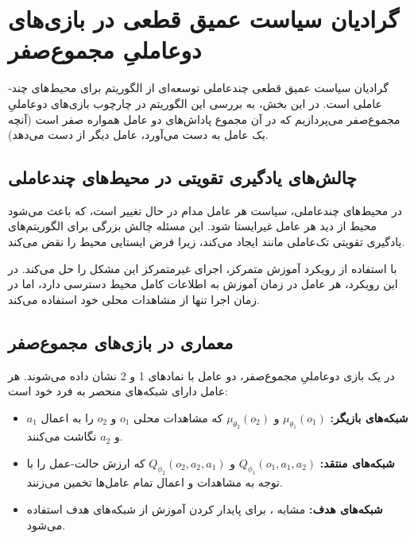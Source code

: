 \section{ گرادیان سیاست عمیق قطعی 
در بازی‌های دو­عاملیِ مجموع‌­صفر
}

گرادیان سیاست عمیق قطعی چند­عاملی
توسعه‌ای از الگوریتم  برای محیط‌های چند­عاملی است. در این بخش، به بررسی این الگوریتم در چارچوب بازی‌های دو­عاملیِ مجموع­‌صفر می‌پردازیم که در آن مجموع پاداش‌های دو عامل همواره صفر است (آنچه یک عامل به دست می‌آورد، عامل دیگر از دست می‌دهد).

\subsection{چالش‌های یادگیری تقویتی در محیط‌های چند­عاملی}

در محیط‌های چند­عاملی، سیاست هر عامل مدام در حال تغییر است، که باعث می‌شود محیط از دید هر عامل غیرایستا شود. این مسئله چالش بزرگی برای الگوریتم‌های یادگیری تقویتی تک‌عاملی مانند  ایجاد می‌کند، زیرا فرض ایستایی محیط را نقض می‌کند.

 با استفاده از رویکرد آموزش متمرکز، اجرای غیرمتمرکز این مشکل را حل می‌کند. در این رویکرد، هر عامل در زمان آموزش به اطلاعات کامل محیط دسترسی دارد، اما در زمان اجرا تنها از مشاهدات محلی خود استفاده می‌کند.

\subsection{معماری  در بازی‌های مجموع­‌صفر}

در یک بازی دو­عاملیِ مجموع­‌صفر، دو عامل با نمادهای 1 و 2 نشان داده می‌شوند. هر عامل دارای شبکه‌های منحصر به فرد خود است:

\begin{itemize}
    \item \textbf{شبکه‌های بازیگر:} $\mu_{\theta_1}(o_1)$ و $\mu_{\theta_2}(o_2)$ که مشاهدات محلی $o_1$ و $o_2$ را به اعمال $a_1$ و $a_2$ نگاشت می‌کنند.
    \item \textbf{شبکه‌های منتقد:} $Q_{\phi_1}(o_1, a_1, a_2)$ و $Q_{\phi_2}(o_2, a_2, a_1)$ که ارزش حالت-عمل را با توجه به مشاهدات و اعمال تمام عامل‌ها تخمین می‌زنند.
    \item \textbf{شبکه‌های هدف:} مشابه ، برای پایدار کردن آموزش از شبکه‌های هدف استفاده می‌شود.
\end{itemize}

